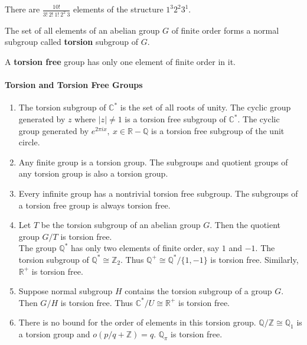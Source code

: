 	There are $\frac{10!}{3!\ 2!\ 1!\ 2^2\ 3}$ elements of the structure $1^3 2^2 3^1$.


\begin{definition}
	The set of all elements of an abelian group $G$ of finite order forms a normal subgroup called \textbf{torsion} subgroup of $G$.
\end{definition}

\begin{definition}
	A \textbf{torsion free} group has only one element of finite order in it.
\end{definition}

\paragraph{Torsion and Torsion Free Groups}
\begin{enumerate}
	\item The torsion subgroup of $\mathbb{C}^\ast$ is the set of all roots of unity.
	The cyclic group generated by $z$ where $|z| \ne 1$ is a torsion free subgroup of $\mathbb{C}^\ast$.
	The cyclic group generated by $e^{2 \pi i x},\ x \in \mathbb{R}-\mathbb{Q}$ is a torsion free subgroup of the unit circle.
	\item Any finite group is a torsion group. The subgroups and quotient groups of any torsion group is also a torsion group. 
	\item Every infinite group has a nontrivial torsion free subgroup. The subgroups of a torsion free group is always torsion free.
	\item Let $T$ be the torsion subgroup of an abelian group $G$. Then the quotient group $G/T$ is torsion free.\\

	The group $\mathbb{Q}^\ast$ has only two elements of finite order, say $1$ and $-1$.
	The torsion subgroup of $\mathbb{Q}^\ast \cong \mathbb{Z}_2$.
	Thus $\mathbb{Q}^+ \cong \mathbb{Q}^\ast / \{ 1,-1 \}$ is torsion free.
	Similarly, $\mathbb{R}^+$ is torsion free.
	\item Suppose normal subgroup $H$ contains the torsion subgroup of a group $G$. Then $G/H$ is torsion free.
	Thus $\mathbb{C}^\ast/U \cong \mathbb{R}^+$ is torsion free.
	\item There is no bound for the order of elements in this torsion group.
		\subitem $\mathbb{Q}/\mathbb{Z} \cong \mathbb{Q}_1$ is a torsion group and $o(p/q+\mathbb{Z}) = q$.
		\subitem $\mathbb{Q}_\pi$ is torsion free.
\end{enumerate}

